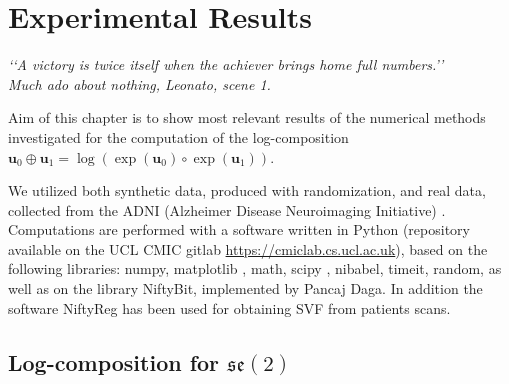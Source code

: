 \chapter{Experimental Results}\label{ch:results}

\begin{flushright}
	\emph{\lq\lq A victory is twice itself when the achiever brings home full numbers.\rq\rq \\
		       \emph{Much ado about nothing}, Leonato, scene 1.}
\end{flushright}

\vspace{0.6cm}


Aim of this chapter is to show most relevant results of the numerical methods investigated for the computation of the log-composition $\mathbf{u}_0\oplus\mathbf{u}_1 = \log(\exp(\mathbf{u}_0)\circ \exp(\mathbf{u}_1))$.

We utilized both synthetic data, produced with randomization, and real data, collected from the ADNI (Alzheimer Disease Neuroimaging Initiative) \cite{jack2008alzheimer}.
Computations are performed with a software written in Python 
(repository available on the UCL CMIC gitlab \href{https://cmiclab.cs.ucl.ac.uk}{https://cmiclab.cs.ucl.ac.uk}), based on 
the following libraries: numpy, matplotlib \cite{hunter2007}, math, scipy \cite{scipy}, nibabel, timeit, random, as well as on the library NiftyBit, implemented by Pancaj Daga. In addition the software NiftyReg \cite{modat2010fast} has been used for obtaining SVF from patients scans. 

\section{Log-composition for $\mathfrak{se}(2)$}


